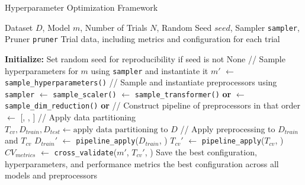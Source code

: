 \begin{algorithm}
\caption{Hyperparameter Optimization Framework}
\label{alg:hyperparameter_optimization_framework}
\begin{algorithmic}[1]
\Require Dataset $D$, Model $m$, Number of Trials $N$, Random Seed $seed$, Sampler \texttt{sampler}, Pruner \texttt{pruner}
\Ensure Trial data, including metrics and configuration for each trial

\State \textbf{Initialize:} Set random seed for reproducibility if seed is not None \label{step:initialize}
 \label{step:trial_loop}
    \Statex // Sample hyperparameters for $m$ using \texttt{sampler} and \newline \hspace*{1.2em} instantiate it 
    \State $m'$ $\gets$ \texttt{sample\_hyperparameters()} \label{step:sample_hyperparameters}
    \Statex
    \Statex // Sample and instantiate preprocessors using \texttt{sampler}
    \State {} $\gets$ \texttt{sample\_scaler()}
    \State {} $\gets$ \texttt{sample\_transformer()} \textbf{or} 
    \State {} $\gets$ \texttt{sample\_dim\_reduction()} \textbf{or} 
    \Statex
    \Statex // Construct pipeline of preprocessors in that order
    \State {} $\gets$ [, , ]
    \Statex
    \Statex // Apply data partitioning
    \State $T_{cv}, D_{train}, D_{test} \gets \text{apply data partitioning to } D$
    \Statex
    \Statex // Apply preprocessing to $D_{train}$ and $T_{cv}$
    \State $D_{train}'$ $\gets$ \texttt{pipeline\_apply}($D_{train}$, )
    \State $T_{cv}'$ $\gets$ \texttt{pipeline\_apply}($T_{cv}$, )
    \Statex
    \State $CV_{metrics}$ $\gets$ \texttt{cross\_validate}($m'$, $T_{cv}'$, ) 
\EndFor
\State Save the best configuration, hyperparameters, and performance metrics \label{step:save_best_configuration}
\State \Return the best configuration across all models and preprocessors \label{step:return_best_configuration}

\end{algorithmic}
\end{algorithm}%

